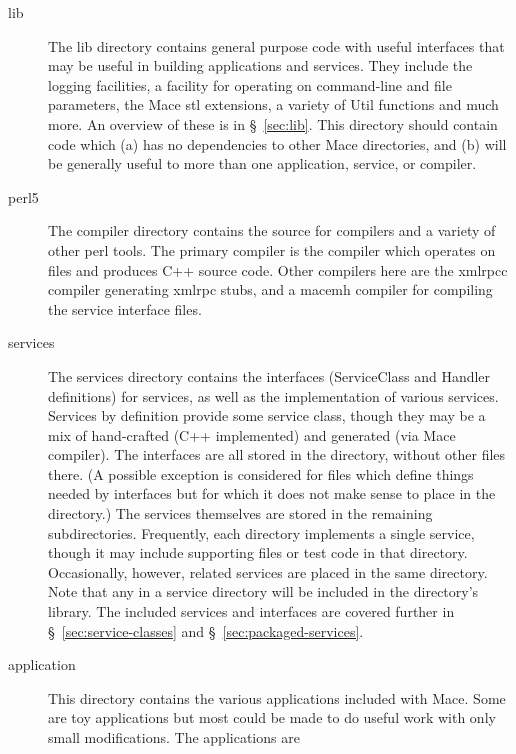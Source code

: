 \begin{description}
\item[lib] The lib directory contains general purpose code with useful interfaces that may be 
            useful in building applications and services.  They include the logging
            facilities, a facility for operating on command-line and file parameters, the Mace
            stl extensions, a variety of Util functions and much more.  An overview of these is
            in \S~\ref{sec:lib}.  This directory should contain code which (a) has no 
            dependencies to other Mace directories, and (b) will be generally useful to more than
            one application, service, or compiler.
\item[perl5] The compiler directory contains the source for compilers
            and a variety of other perl tools.  The primary compiler is
            the  compiler which operates on \mac files
            and produces C++ source code.  Other compilers here are the
            xmlrpcc compiler generating xmlrpc stubs, and a macemh
            compiler for compiling the service interface files.
\item[services] The services directory contains the interfaces (ServiceClass and Handler definitions) 
            for services, as well as the implementation of various services.  Services by definition
            provide some service class, though they may be a mix of hand-crafted (C++ implemented) and
            generated (via Mace compiler).  The interfaces are all stored in the 
            directory, without other files there.  (A possible exception is considered for files which
            define things needed by interfaces but for which it does not make sense to place in the 
             directory.)  The services themselves are stored in the remaining subdirectories.
            Frequently, each directory implements a single service, though it may include supporting files
            or test code in that directory.  Occasionally, however, related services are placed in the 
            same directory.  Note that any  in a service directory will be included
            in the directory's library.  The included services and interfaces are covered further in 
            \S~\ref{sec:service-classes} and \S~\ref{sec:packaged-services}.
\item[application] This directory contains the various applications included with Mace.  Some are toy applications
            but most could be made to do useful work with only small modifications.  The applications are

\end{description}
